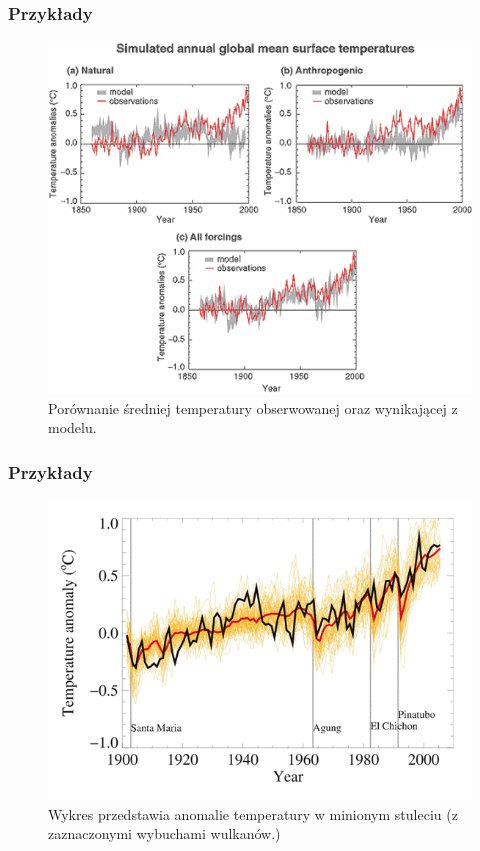 \documentclass{beamer}
\begin{document}
\begin{frame}
	\frametitle{Przykłady}
	\begin{figure}[h]
		\begin{center}
			\includegraphics[width=0.7\linewidth]{images/przyklady/przyklad1.png}
			\caption{Porównanie średniej temperatury obserwowanej oraz wynikającej 
				z modelu.\cite{b5}}
		\end{center}
	\end{figure}
	
\end{frame}


\begin{frame}
	\frametitle{Przykłady}
	\begin{figure}[h]
		\begin{center}
			\includegraphics[width=0.7\linewidth]{images/przyklady/przyklad2.png}
			\caption{Wykres przedstawia anomalie temperatury w minionym stuleciu (z zaznaczonymi wybuchami wulkanów.)\cite{b4}}
		\end{center}
	\end{figure}
	
\end{frame}
\end{document}
